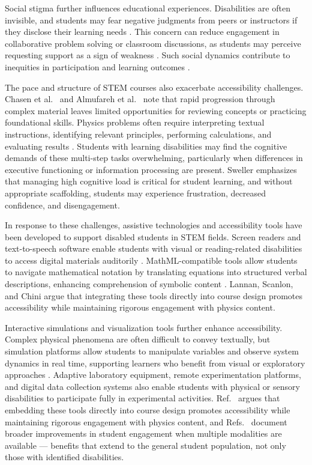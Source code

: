 \documentclass[]{aastex701}
\begin{document}
Social stigma further influences educational experiences. Disabilities are often invisible, and students may fear negative judgments from peers or instructors if they disclose their learning needs \autocite{Gull2025, AlAzawei2023}. This concern can reduce engagement in collaborative problem solving or classroom discussions, as students may perceive requesting support as a sign of weakness \autocite{Gull2025, AlAzawei2023}. Such social dynamics contribute to inequities in participation and learning outcomes \autocite{AlAzawei2023}.

The pace and structure of STEM courses also exacerbate accessibility challenges. Chasen et al.\ \autocite{Chasen2025} and Almufareh et al.\ \autocite{Almufareh2025} note that rapid progression through complex material leaves limited opportunities for reviewing concepts or practicing foundational skills. Physics problems often require interpreting textual instructions, identifying relevant principles, performing calculations, and evaluating results \autocite{Kontopoulou2024, Sweller2011}. Students with learning disabilities may find the cognitive demands of these multi-step tasks overwhelming, particularly when differences in executive functioning or information processing are present. Sweller \autocite{Sweller2011} emphasizes that managing high cognitive load is critical for student learning, and without appropriate scaffolding, students may experience frustration, decreased confidence, and disengagement.

In response to these challenges, assistive technologies and accessibility tools have been developed to support disabled students in STEM fields. Screen readers and text-to-speech software enable students with visual or reading-related disabilities to access digital materials auditorily \autocite{Wattanakasiwich2025, Alenezi2025}. MathML-compatible tools allow students to navigate mathematical notation by translating equations into structured verbal descriptions, enhancing comprehension of symbolic content \autocite{Wattanakasiwich2025, Alenezi2025}. Lannan, Scanlon, and Chini \autocite{Lannan2019} argue that integrating these tools directly into course design promotes accessibility while maintaining rigorous engagement with physics content.

Interactive simulations and visualization tools further enhance accessibility. Complex physical phenomena are often difficult to convey textually, but simulation platforms allow students to manipulate variables and observe system dynamics in real time, supporting learners who benefit from visual or exploratory approaches \autocite{Wattanakasiwich2025, Alenezi2025, Lannan2019}. Adaptive laboratory equipment, remote experimentation platforms, and digital data collection systems also enable students with physical or sensory disabilities to participate fully in experimental activities. Ref.~\cite{Lannan2019} argues that embedding these tools directly into course design promotes accessibility while maintaining rigorous engagement with physics content, and Refs.~\cite{Wattanakasiwich2025, Alenezi2025} document broader improvements in student engagement when multiple modalities are available --- benefits that extend to the general student population, not only those with identified disabilities.
\end{document}
